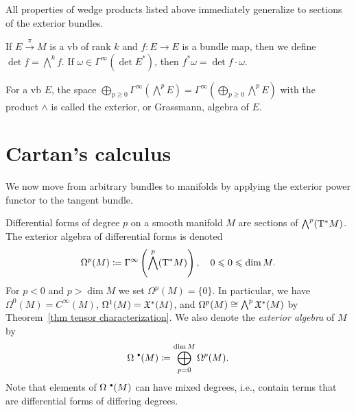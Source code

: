 All properties of wedge products listed above immediately generalize to sections of the exterior bundles.

\begin{defn}
If $E\overset\pi\to M$ is a \gls{vb} of rank $k$ and $f:E\to E$ is a bundle map, then we define $\det f=\bigwedge^k f$. If $\omega\in\Gamma^\infty(\det E^\ast)$, then $f^\ast \omega=\det f\cdot \omega$.
\end{defn}

\begin{defn}
For a \gls{vb} $E$, the space $\bigoplus_{p\geq 0}\Gamma^\infty(\bigwedge^p E)=\Gamma^\infty\left(\bigoplus_{p\geq 0}\bigwedge^p E\right)$ with the product $\wedge$ is called the exterior, or Grassmann, algebra of $E$.
\end{defn}







\section{Cartan's calculus}

We now move from arbitrary bundles to manifolds by applying the exterior power functor to the tangent bundle.

\begin{defn}
    Differential forms of degree $p$ on a smooth manifold $M$ are sections of $\bigwedge^p (\mathrm{T}^\ast M)$. The exterior algebra of differential forms is denoted
    \[\Omega^p(M)\coloneqq \Gamma^\infty\left(\bigwedge^p(\mathrm{T}^\ast M)\right),\quad 0\leqslant 0\leqslant\dim M.\]
    For $p<0$ and $p>\dim M$ we set $\Omega^p(M)=\{0\}$.
    In particular, we have $\Omega^0(M)=C^\infty(M)$, $\Omega^1(M)=\mathfrak{X}^\ast (M)$, and $\Omega^p(M)\cong \bigwedge^p \mathfrak{X}^\ast(M)$ by Theorem~\ref{thm tensor characterization}. We also denote the \emph{exterior algebra} of $M$ by
    \[\Omega^{\smbullet}(M)\coloneq\bigoplus_{p=0}^{\dim M} \Omega^p(M).\]
    Note that elements of $\Omega^{\smbullet}(M)$ can have mixed degrees, i.e., contain terms that are differential forms of differing degrees.
\end{defn}


